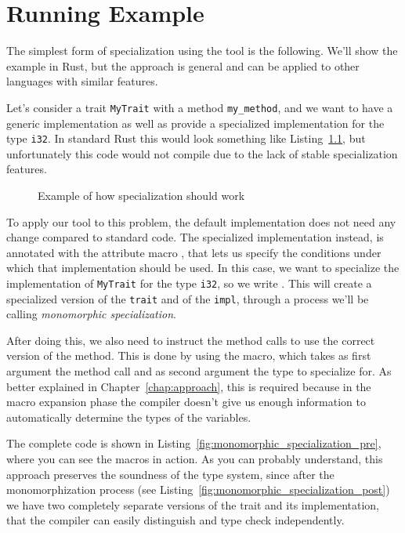 \chapter{Running Example}\label{chap:running_example}

The simplest form of specialization using the tool is the following.
We'll show the example in Rust, but the approach is general and can be applied to other languages with similar features.

Let's consider a trait \texttt{MyTrait} with a method \texttt{my\_method}, and we want to have a generic implementation as well as provide a specialized implementation for the type \texttt{i32}.
In standard Rust this would look something like Listing~\ref{fig:monomorphic_specialization_problem}, but unfortunately this code would not compile due to the lack of stable specialization features.

\begin{figure}[htbp!]
	\centering
	\captionsetup{type=listing,skip=2pt}
	\caption{Example of how specialization should work}
	\label{fig:monomorphic_specialization_problem}
\end{figure}

To apply our tool to this problem, the default implementation does not need any change compared to standard code.
The specialized implementation instead, is annotated with the attribute macro \inlinerust{#[when(...)]}, that lets us specify the conditions under which that implementation should be used.
In this case, we want to specialize the implementation of \texttt{MyTrait} for the type \texttt{i32}, so we write \inlinerust{#[when(T = i32)]}.
This will create a specialized version of the \texttt{trait} and of the \texttt{impl}, through a process we'll be calling \textit{monomorphic specialization}.

After doing this, we also need to instruct the method calls to use the correct version of the method.
This is done by using the  macro, which takes as first argument the method call and as second argument the type to specialize for.
As better explained in Chapter~\ref{chap:approach}, this is required because in the macro expansion phase the compiler doesn't give us enough information to automatically determine the types of the variables.

The complete code is shown in Listing~\ref{fig:monomorphic_specialization_pre}, where you can see the macros in action.
As you can probably understand, this approach preserves the soundness of the type system, since after the monomorphization process (see Listing~\ref{fig:monomorphic_specialization_post}) we have two completely separate versions of the trait and its implementation, that the compiler can easily distinguish and type check independently.

